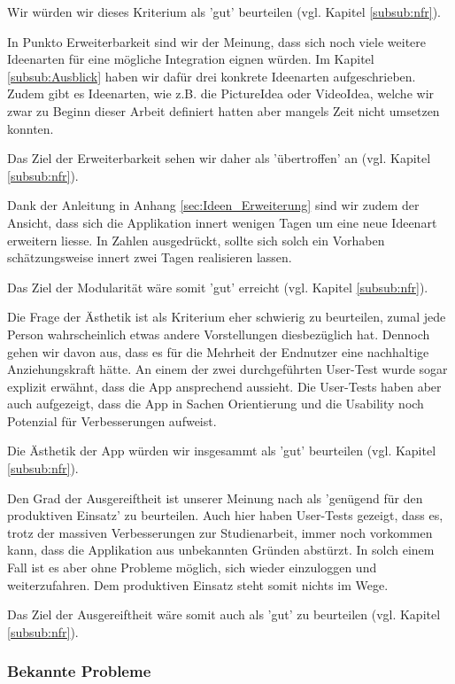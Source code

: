 Wir würden wir dieses Kriterium als 'gut' beurteilen (vgl. Kapitel \ref{subsub:nfr}).
 
 In Punkto Erweiterbarkeit sind wir der Meinung, dass sich  noch viele weitere Ideenarten für eine mögliche Integration eignen würden. Im Kapitel \ref{subsub:Ausblick} haben wir dafür drei konkrete Ideenarten aufgeschrieben. Zudem gibt es Ideenarten, wie z.B. die PictureIdea oder VideoIdea, welche wir zwar zu Beginn dieser Arbeit definiert hatten aber mangels Zeit nicht umsetzen konnten. 
 
Das Ziel der Erweiterbarkeit sehen wir daher als 'übertroffen' an (vgl. Kapitel \ref{subsub:nfr}).

Dank der Anleitung in Anhang \ref{sec:Ideen_Erweiterung} sind wir zudem der Ansicht, dass sich die Applikation innert wenigen Tagen um eine neue Ideenart erweitern liesse. In Zahlen ausgedrückt, sollte sich solch ein Vorhaben schätzungsweise innert zwei Tagen realisieren lassen. 

Das Ziel der Modularität wäre somit 'gut' erreicht (vgl. Kapitel \ref{subsub:nfr}).

Die Frage der Ästhetik ist als Kriterium eher schwierig zu beurteilen, zumal jede Person wahrscheinlich etwas andere Vorstellungen diesbezüglich hat. Dennoch gehen wir davon aus, dass es für die Mehrheit der Endnutzer eine nachhaltige Anziehungskraft hätte. An einem der zwei durchgeführten User-Test wurde sogar explizit erwähnt, dass die App ansprechend aussieht. Die User-Tests haben aber auch aufgezeigt, dass die App in Sachen Orientierung und die Usability noch Potenzial für Verbesserungen aufweist.

Die Ästhetik der App würden wir insgesammt als 'gut' beurteilen (vgl. Kapitel \ref{subsub:nfr}).

Den Grad der Ausgereiftheit ist unserer Meinung nach als 'genügend für den produktiven Einsatz' zu beurteilen. Auch hier haben User-Tests gezeigt, dass es, trotz der massiven Verbesserungen zur Studienarbeit, immer noch vorkommen kann, dass die Applikation aus unbekannten Gründen abstürzt. In solch einem Fall ist es aber ohne Probleme möglich, sich wieder einzuloggen und weiterzufahren. Dem produktiven Einsatz steht somit nichts im Wege.

Das Ziel der Ausgereiftheit wäre somit auch als 'gut' zu beurteilen (vgl. Kapitel \ref{subsub:nfr}). 

\subsubsection{Bekannte Probleme}

